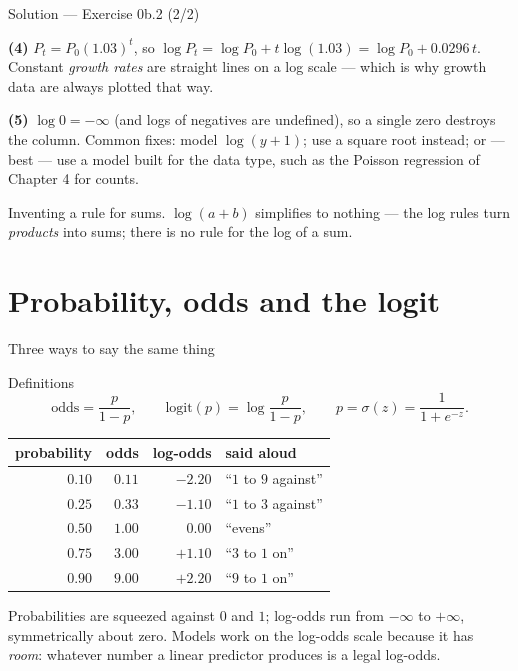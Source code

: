 \documentclass[aspectratio=169,11pt]{beamer}
\begin{document}
\begin{frame}{Solution --- Exercise 0b.2 (2/2)}
  \begin{solutionbox}
    \textbf{(4)} $P_t = P_0(1.03)^t$, so
    $\log P_t = \log P_0 + t\log(1.03) = \log P_0 + 0.0296\,t$. Constant
    \emph{growth rates} are straight lines on a log scale --- which is why
    growth data are always plotted that way.

    \textbf{(5)} $\log 0 = -\infty$ (and logs of negatives are undefined), so a
    single zero destroys the column. Common fixes: model $\log(y + 1)$; use a
    square root instead; or --- best --- use a model built for the data type,
    such as the Poisson regression of Chapter 4 for counts.
  \end{solutionbox}
  \begin{mistake}
    Inventing a rule for sums. $\log(a+b)$
    simplifies to nothing --- the log rules turn \emph{products} into sums;
    there is no rule for the log of a sum.
  \end{mistake}
\end{frame}


\section[Odds and the logit]{Probability, odds and the logit}

\begin{frame}{Three ways to say the same thing}\label{frm:threeways}
  \footnotesize
  \begin{block}{Definitions}
    \[
      \mathrm{odds} = \frac{p}{1-p},
      \qquad
      \mathrm{logit}(p) = \log\frac{p}{1-p},
      \qquad
      p = \sigma(z) = \frac{1}{1+e^{-z}} .
    \]
  \end{block}
  \begin{center}
  \begin{tabular}{@{}rrrl@{}}
    \toprule
    \textbf{probability} & \textbf{odds} & \textbf{log-odds} & \textbf{said aloud} \\
    \midrule
    $0.10$ & $0.11$ & $-2.20$ & ``$1$ to $9$ against'' \\
    $0.25$ & $0.33$ & $-1.10$ & ``$1$ to $3$ against'' \\
    $0.50$ & $1.00$ & $0.00$  & ``evens'' \\
    $0.75$ & $3.00$ & $+1.10$ & ``$3$ to $1$ on'' \\
    $0.90$ & $9.00$ & $+2.20$ & ``$9$ to $1$ on'' \\
    \bottomrule
  \end{tabular}
  \end{center}
  \begin{takeaway}
    Probabilities are squeezed against $0$ and $1$; log-odds run from $-\infty$
    to $+\infty$, symmetrically about zero. Models work on the log-odds scale
    because it has \emph{room}: whatever number a linear predictor produces is
    a legal log-odds.
  \end{takeaway}
\end{frame}
\end{document}
